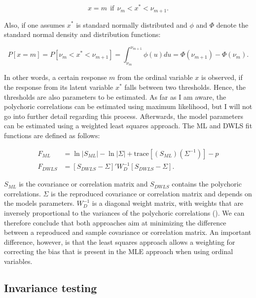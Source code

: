 \documentclass[11pt]{article}
\begin{document}
\begin{equation}
  x = m \:\: \text{if} \:\: \nu_m < x^* < \nu_{m+1} .
\end{equation}

Also, if one assumes $x^*$ is standard normally distributed and $\phi$ and
$\Phi$ denote the standard normal density and distribution functions:

\begin{equation}
  P[x=m] = P[\nu_m < x^* < \nu_{m+1}] = \int^{\nu_{m+1}}_{\nu_m} \phi(u)du = \Phi(\nu_{m+1}) - \Phi(\nu_m) .
\end{equation}

In other words, a certain response $m$ from the ordinal variable $x$ is
observed, if the response from its latent variable $x^*$ falls between two
thresholds. Hence, the thresholds are also parameters to be estimated. As far as
I am aware, the polychoric correlations can be estimated using maximum
likelihood, but I will not go into further detail regarding this process.
Afterwards, the model parameters can be estimated using a weighted least squares
approach. The ML and DWLS fit functions are defined as follows:

\begin{align}
  F_{ML} &= \ln |S_{ML}| - \ln |\Sigma| + \text{trace}[(S_{ML})(\Sigma^{-1})] - p \tag{ML fit function} \\
  F_{DWLS} &= [S_{DWLS}-\Sigma]' W^{-1}_D [S_{DWLS}-\Sigma].                      \tag{DWLS fit function}
\end{align}

$S_{ML}$ is the covariance or correlation matrix and $S_{DWLS}$ contains the
polychoric correlations. $\Sigma$ is the reproduced covariance or correlation
matrix and depends on the models parameters. $W_D^{-1}$ is a diagonal weight
matrix, with weights that are inversely proportional to the variances of the
polychoric correlations (\cite{yangwallentin2010}). We can therefore conclude
that both approaches aim at minimizing the difference between a reproduced and
sample covariance or correlation matrix. An important difference, however, is
that the least squares approach allows a weighting for correcting the bias that
is present in the MLE approach when using ordinal variables.

\FloatBarrier\subsection{Invariance testing}

\end{document}
